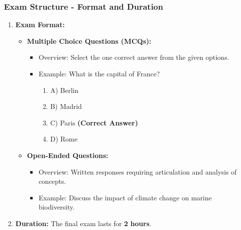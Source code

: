 \documentclass{beamer}
\begin{document}
\begin{frame}[fragile]
    \frametitle{Exam Structure - Format and Duration}
    \begin{enumerate}
        \item \textbf{Exam Format:}
            \begin{itemize}
                \item \textbf{Multiple Choice Questions (MCQs):}
                    \begin{itemize}
                        \item Overview: Select the one correct answer from the given options.
                        \item Example: What is the capital of France? 
                        \begin{enumerate}
                            \item A) Berlin
                            \item B) Madrid
                            \item C) Paris \textbf{(Correct Answer)}
                            \item D) Rome
                        \end{enumerate}
                    \end{itemize}
                \item \textbf{Open-Ended Questions:}
                    \begin{itemize}
                        \item Overview: Written responses requiring articulation and analysis of concepts.
                        \item Example: Discuss the impact of climate change on marine biodiversity.
                    \end{itemize}
            \end{itemize}
        \item \textbf{Duration:} The final exam lasts for \textbf{2 hours}.
    \end{enumerate}
\end{frame}
\end{document}
